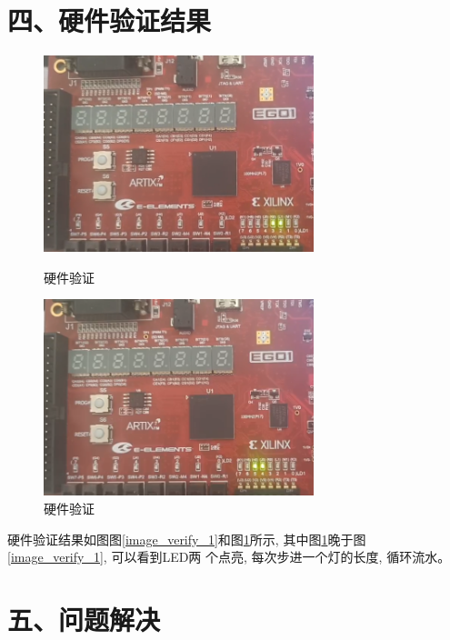 \documentclass{article}
\newcommand{\fourhao}{\fontsize{14pt}{\baselineskip}\selectfont} %
\newcommand{\xiaosihao}{\fontsize{12pt}{\baselineskip}\selectfont} %
\begin{document}
\section*{\fourhao 四、硬件验证结果}
\xiaosihao
{}
\begin{figure}[htbp]
    \begin{minipage}[t]{0.45\linewidth}
        \centering
        \includegraphics[width=0.7\textwidth]{image/2024-06-28-12-58-06.png}
        \caption{硬件验证}
        \label{image_verify_1}
    \end{minipage}
    \begin{minipage}[t]{0.45\linewidth}
        \centering
        \includegraphics[width=0.7\textwidth]{image/2024-06-28-12-58-21.png}
        \caption{硬件验证}
        \label{image_verify_2}
    \end{minipage}
\end{figure}
硬件验证结果如图图\ref{image_verify_1}和图\ref{image_verify_2}所示,
其中图\ref{image_verify_2}晚于图\ref{image_verify_1}, 可以看到LED两
个点亮, 每次步进一个灯的长度, 循环流水。
\section*{\fourhao 五、问题解决}
\xiaosihao
{}
\end{document}
